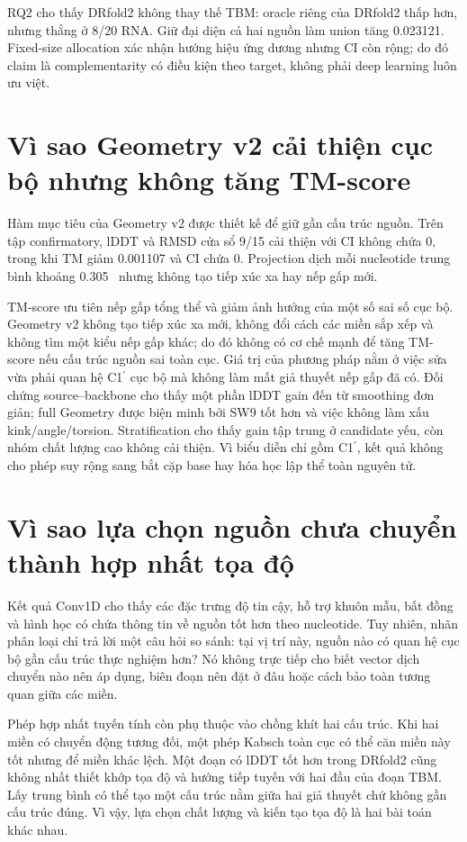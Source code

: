 \documentclass[12pt,a4paper,oneside]{report}
\newcommand{\cprime}{C1$^{\prime}$}
\newcommand{\angstrom}{\text{\AA}}
\begin{document}
RQ2 cho thấy DRfold2 không thay thế TBM: oracle riêng của DRfold2 thấp hơn, nhưng thắng
ở 8/20 RNA. Giữ đại diện cả hai nguồn làm union tăng 0.023121. Fixed-size allocation
xác nhận hướng hiệu ứng dương nhưng CI còn rộng; do đó claim là complementarity có điều
kiện theo target, không phải deep learning luôn ưu việt.

\section{Vì sao Geometry v2 cải thiện cục bộ nhưng không tăng TM-score}

Hàm mục tiêu của Geometry v2 được thiết kế để giữ gần cấu trúc nguồn. Trên tập
confirmatory, lDDT và RMSD cửa sổ 9/15 cải thiện với CI không chứa 0, trong khi TM giảm
0.001107 và CI chứa 0. Projection dịch mỗi nucleotide trung bình khoảng
0.305~\angstrom{} nhưng không tạo tiếp xúc xa hay nếp gấp mới.

TM-score ưu tiên nếp gấp tổng thể và giảm ảnh hưởng của một số sai số cục bộ. Geometry
v2 không tạo tiếp xúc xa mới, không đổi cách các miền sắp xếp và không tìm một kiểu nếp gấp
khác; do đó không có cơ chế mạnh để tăng TM-score nếu cấu trúc nguồn sai toàn cục. Giá
trị của phương pháp nằm ở việc sửa vừa phải quan hệ \cprime{} cục bộ mà không làm mất
giả thuyết nếp gấp đã có. Đối chứng source--backbone cho thấy một phần lDDT gain đến từ
smoothing đơn giản; full Geometry được biện minh bởi SW9 tốt hơn và việc không làm xấu
kink/angle/torsion. Stratification cho thấy gain tập trung ở candidate yếu, còn nhóm
chất lượng cao không cải thiện. Vì biểu diễn chỉ gồm \cprime{}, kết quả không cho phép
suy rộng sang bắt cặp base hay hóa học lập thể toàn nguyên tử.

\iffalse
\section{Vì sao lựa chọn nguồn chưa chuyển thành hợp nhất tọa độ}

Kết quả Conv1D cho thấy các đặc trưng độ tin cậy, hỗ trợ khuôn mẫu, bất đồng và hình học
có chứa thông tin về nguồn tốt hơn theo nucleotide. Tuy nhiên, nhãn phân loại chỉ trả
lời một câu hỏi so sánh: tại vị trí này, nguồn nào có quan hệ cục bộ gần cấu trúc thực
nghiệm hơn? Nó không trực tiếp cho biết vector dịch chuyển nào nên áp dụng, biên đoạn
nên đặt ở đâu hoặc cách bảo toàn tương quan giữa các miền.

Phép hợp nhất tuyến tính còn phụ thuộc vào chồng khít hai cấu trúc. Khi hai miền có
chuyển động tương đối, một phép Kabsch toàn cục có thể căn miền này tốt nhưng để miền
khác lệch. Một đoạn có lDDT tốt hơn trong DRfold2 cũng không nhất thiết khớp tọa độ và
hướng tiếp tuyến với hai đầu của đoạn TBM. Lấy trung bình có thể tạo một cấu trúc nằm
giữa hai giả thuyết chứ không gần cấu trúc đúng. Vì vậy, lựa chọn chất lượng và kiến tạo
tọa độ là hai bài toán khác nhau.
\end{document}
